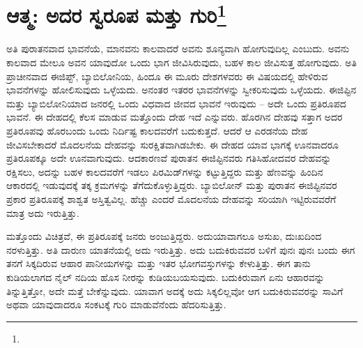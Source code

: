 
\chapter[ಆತ್ಮ: ಅದರ ಸ್ವರೂಪ ಮತ್ತು ಗುರಿ]{ಆತ್ಮ: ಅದರ ಸ್ವರೂಪ ಮತ್ತು ಗುರಿ\protect\footnote{}}

ಅತಿ ಪುರಾತನವಾದ ಭಾವನೆಯೆ, ಮಾನವನು ಕಾಲವಾದರೆ ಅವನು ಶೂನ್ಯವಾಗಿ ಹೋಗುವುದಿಲ್ಲ ಎಂಬುದು. ಅವನು ಕಾಲವಾದ ಮೇಲೂ ಅವನ ಯಾವುದೋ ಒಂದು ಭಾಗ ಜೀವಿಸಿರುವುದು, ಬಹಳ ಕಾಲ ಜೀವಿಸುತ್ತ ಹೋಗುವುದು. ಅತಿ ಪ್ರಾಚೀನವಾದ ಈಜಿಪ್ಟ್, ಬ್ಯಾಬಿಲೋನಿಯ, ಹಿಂದೂ ಈ ಮೂರು ದೇಶಗಳವರು ಈ ವಿಷಯದಲ್ಲಿ ಹೇಳಿರುವ ಭಾವನೆಗಳನ್ನು ಹೋಲಿಸುವುದು ಒಳ್ಳೆಯದು. ಅನಂತರ ಇತರರ ಭಾವನೆಗಳನ್ನು ಸ್ವೀಕರಿಸುವುದು ಒಳ್ಳೆಯದು. ಈಜಿಪ್ಟಿನ ಮತ್ತು ಬ್ಯಾಬಿಲೋನಿಯಾದ ಜನರಲ್ಲಿ ಒಂದು ವಿಧವಾದ ಜೀವದ ಭಾವನೆ ಇರುವುದು – ಅದೇ ಒಂದು ಪ್ರತಿರೂಪದ ಭಾವನೆ. ಈ ದೇಹದಲ್ಲಿ ಕೆಲಸ ಮಾಡುವ ಮತ್ತೊಂದು ದೇಹ ಇದೆ ಎನ್ನುವರು. ಹೊರಗಿನ ದೇಹವು ಸತ್ತಾಗ ಅದರ ಪ್ರತಿರೂಪವು ಹೊರಬಂದು ಒಂದು ನಿರ್ದಿಷ್ಟ ಕಾಲದವರೆಗೆ ಬದುಕುತ್ತದೆ. ಆದರೆ ಆ ಎರಡನೆಯ ದೇಹ ಜೀವಿಸಬೇಕಾದರೆ ಮೊದಲನೆಯ ದೇಹವನ್ನು ಸುರಕ್ಷಿತವಾಗಿಡಬೇಕು. ಈ ದೇಹದ ಯಾವ ಭಾಗಕ್ಕೆ ಊನವಾದರೂ ಪ್ರತಿರೂಪಕ್ಕೂ ಅದೇ ಊನವಾಗುವುದು. ಆದಕಾರಣವೆ ಪುರಾತನ ಈಜಿಪ್ಟಿನವರು ಗತಿಸಿಹೋದವರ ದೇಹವನ್ನು ರಕ್ಷಿಸಲು, ಅದನ್ನು ಬಹಳ ಕಾಲದವರೆಗೆ ಇಡಲು ಪಿರಮಿಡ್‌ಗಳನ್ನು ಕಟ್ಟುತ್ತಿದ್ದರು ಮತ್ತು ಹೆಣವನ್ನು ಹಿಂದಿನ ಆಕಾರದಲ್ಲಿ ಇಡುವುದಕ್ಕೆ ತಕ್ಕ ಕ್ರಮಗಳನ್ನು ತೆಗೆದುಕೊಳ್ಳುತ್ತಿದ್ದರು. ಬ್ಯಾಬಿಲೋನ್ ಮತ್ತು ಪುರಾತನ ಈಜಿಪ್ಟಿನವರ ಪ್ರಕಾರ ಪ್ರತಿರೂಪಕ್ಕೆ ಶಾಶ್ವತ ಅಸ್ತಿತ್ವವಿಲ್ಲ. ಹೆಚ್ಚು ಎಂದರೆ ಮೊದಲನೆಯ ದೇಹವನ್ನು ಸರಿಯಾಗಿ ಇಟ್ಟಿರುವವರೆಗೆ ಮಾತ್ರ ಅದು ಇರುತ್ತಿತ್ತು.

ಮತ್ತೊಂದು ವಿಚಿತ್ರವೆ, ಈ ಪ್ರತಿರೂಪಕ್ಕೆ ಜನರು ಅಂಜುತ್ತಿದ್ದರು. ಅದು\break ಯಾವಾಗಲೂ ಅಸುಖ, ದುಃಖದಿಂದ ನರಳುತ್ತಿತ್ತು. ಅತಿ ದಾರುಣ ಯಾತನೆಯಲ್ಲಿ ಅದು ಇರುತ್ತಿತ್ತು. ಅದು ಬದುಕಿರುವವರ ಬಳಿಗೆ ಪುನಃ ಪುನಃ ಬಂದು ಈಗ ತನಗೆ ಸಿಕ್ಕದಿರುವ ಆಹಾರ ಪಾನೀಯಗಳನ್ನು ಮತ್ತು ಇತರ ಭೋಗವಸ್ತುಗಳನ್ನು ಕೇಳುತ್ತಿತ್ತು. ಈಗ ತಾನು ಕುಡಿಯಲಾಗದ ನೈಲ್ ನದಿಯ ಹೊಸ ನೀರನ್ನು ಕುಡಿಯಬಯಸುವುದು. ಬದುಕಿರುವಾಗ ಏನು ಆಹಾರವನ್ನು ತಿನ್ನುತ್ತಿತ್ತೋ, ಅದೇ ಮತ್ತೆ ಬೇಕೆನ್ನುವುದು. ಯಾವಾಗ ಅದಕ್ಕೆ ಅದು ಸಿಕ್ಕಲಿಲ್ಲವೋ ಆಗ ಬದುಕಿರುವವರನ್ನು ಸಾವಿಗೆ ಅಥವಾ ಯಾವುದಾದರೂ ಸಂಕಟಕ್ಕೆ ಗುರಿ ಮಾಡುವೆನೆಂದು ಹೆದರಿಸುತ್ತಿತ್ತು.

\vskip 2pt

